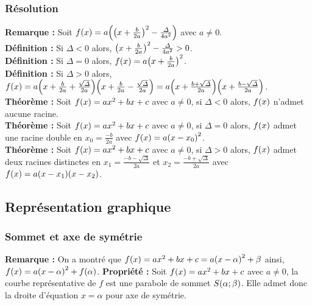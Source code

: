 \documentclass[a4paper,titlepage]{article}
\let\oldleft\left
\renewcommand{\left}{\mathopen{}\mathclose\bgroup\oldleft}
\let\oldright\right
\renewcommand{\right}{\aftergroup\egroup\oldright}
\begin{document}
        \subsubsection{Résolution}
            \textbf{Remarque :} Soit $f\left(x\right)=a\left(\left(x+\frac{b}{2a}\right)^{2}-\frac{\varDelta}{4a^{2}}\right)$ avec $a\neq0$.
            \\
            \textbf{Définition :} Si $\varDelta<0$ alors, $\left(x+\frac{b}{2a}\right)^{2}-\frac{\varDelta}{4a^{2}}>0$.
            \\
            \textbf{Définition :} Si $\varDelta=0$ alors, $f\left(x\right)=a\left(x+\frac{b}{2a}\right)^{2}$.
            \\
            \textbf{Définition :} Si $\varDelta>0$ alors,  $f\left(x\right)=a\left(x+\frac{b}{2a}+\frac{\sqrt{\varDelta}}{2a}\right)\left(x+\frac{b}{2a}-\frac{\sqrt{\varDelta}}{2a}\right)=a\left(x+\frac{b+\sqrt{\varDelta}}{2a}\right)\left(x+\frac{b-\sqrt{\varDelta}}{2a}\right)$.
            \\
            \textbf{Théorème :} Soit $f\left(x\right)=ax^{2}+bx+c$ avec $a\neq0$, si $\varDelta<0$ alors, $f\left(x\right)$ n’admet aucune racine.
            \\
            \textbf{Théorème :} Soit $f\left(x\right)=ax^{2}+bx+c$ avec $a\neq0$, si $\varDelta=0$ alors, $f\left(x\right)$ admet une racine double en $x_{0}=\frac{-b}{2a}$ avec $f\left(x\right)=a\left(x-x_{0}\right)^{2}$.
            \\
            \textbf{Théorème :} Soit $f\left(x\right)=ax^{2}+bx+c$ avec $a\neq0$, si $\varDelta>0$ alors, $f\left(x\right)$ admet deux racines distinctes en $x_{1}=\frac{-b-\sqrt{\varDelta}}{2a}$ et $x_{2}=\frac{-b+\sqrt{\varDelta}}{2a}$ avec $f\left(x\right)=a\left(x-x_{1}\right)\left(x-x_{2}\right)$.
    \subsection{Représentation graphique}
        \subsubsection{Sommet et axe de symétrie}
            \textbf{Remarque :} On a montré que $f\left(x\right)=ax^{2}+bx+c=a\left(x-\alpha\right)^{2}+\beta$ ainsi, $f\left(x\right)=a\left(x-\alpha\right)^{2}+f\left(\alpha\right)$.
            \textbf{Propriété :} Soit $f\left(x\right)=ax^{2}+bx+c$ avec $a\neq0$, la courbe représentative de $f$ est une parabole de sommet $S\left(\alpha;\beta\right)$. Elle admet donc la droite d’équation $x=\alpha$ pour axe de symétrie.
\end{document}

